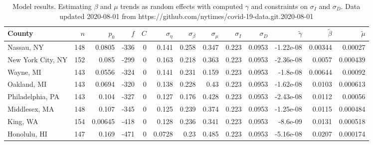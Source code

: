 \documentclass[12pt,letterpaper]{article}
\begin{document}
\cite{Sibert2017,Nielsen2014b}


\clearpage


\begin{sidewaystable}
\caption{\label{tab:cons}
Model results. Estimating $\beta$ and $\mu$ trends as random effects with computed $\gamma$
and constraints on  $\sigma_I$ and $\sigma_D$. 
Data updated 2020-08-01 from https://github.com/nytimes/covid-19-data.git.2020-08-01
}
\centering
{\footnotesize


\begin{tabular}{lrrrrrrrrrrrr}
\hline
 County             &   $n$ &   $p_0$ &   $f$ &   $C$ &   $\sigma_\eta$ &   $\sigma_\beta$ &   $\sigma_\mu$ &   $\sigma_I$ &   $\sigma_D$ &   $\tilde\gamma$ &   $\tilde{\beta}$ &   $\tilde{\mu}$ \\
\hline
 Nassau, NY         & 148   & 0.0805  &  -336 &     0 &          0.141  &            0.258 &         0.347  &        0.223 &       0.0953 &        -1.22e-08 &           0.00344 &        0.00027  \\
 New York City, NY  & 152   & 0.085   &  -299 &     0 &          0.163  &            0.218 &         0.363  &        0.223 &       0.0953 &        -2.36e-08 &           0.0057  &        0.000439 \\
 Wayne, MI          & 143   & 0.0556  &  -324 &     0 &          0.141  &            0.231 &         0.159  &        0.223 &       0.0953 &        -1.8e-08  &           0.00644 &        0.00092  \\
 Oakland, MI        & 143   & 0.0694  &  -320 &     0 &          0.138  &            0.228 &         0.43   &        0.223 &       0.0953 &        -1.62e-08 &           0.0103  &        0.000613 \\
 Philadelphia, PA   & 143   & 0.104   &  -327 &     0 &          0.127  &            0.176 &         0.428  &        0.223 &       0.0953 &        -2.43e-08 &           0.0112  &        0.00056  \\
 Middlesex, MA      & 148   & 0.107   &  -345 &     0 &          0.125  &            0.239 &         0.374  &        0.223 &       0.0953 &        -1.25e-08 &           0.0115  &        0.000484 \\
 King, WA           & 154   & 0.00645 &  -418 &     0 &          0.128  &            0.236 &         0.341  &        0.223 &       0.0953 &        -8.6e-09  &           0.0131  &        0.000518 \\
 Honolulu, HI       & 147   & 0.169   &  -471 &     0 &          0.0728 &            0.23  &         0.485  &        0.223 &       0.0953 &        -5.16e-08 &           0.0207  &        0.000174 \\

\end{tabular}}
\end{sidewaystable}
\end{document}
